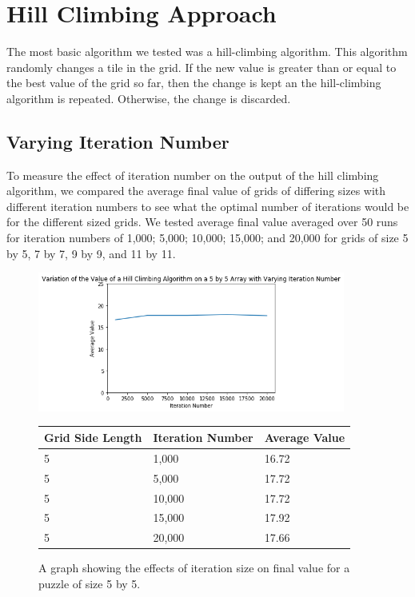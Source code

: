 \documentclass[12pt]{article}
\begin{document}
\section*{Hill Climbing Approach}

The most basic algorithm we tested was a hill-climbing algorithm. This algorithm randomly changes a tile in the grid. If the new value is greater than or equal to the best value of the grid so far, then the change is kept an the hill-climbing algorithm is repeated. Otherwise, the change is discarded. 

\subsection*{Varying Iteration Number}

To measure the effect of iteration number on the output of the hill climbing algorithm, we compared the average final value of grids of differing sizes with different iteration numbers to see what the optimal number of iterations would be for the different sized grids. We tested average final value averaged over 50 runs for iteration numbers of 1,000; 5,000; 10,000; 15,000; and 20,000 for grids of size 5 by 5, 7 by 7, 9 by 9, and 11 by 11.

\begin{figure}[H]
    \centering
    \includegraphics[width=0.9\textwidth]{hill_climbing_5x5_iterations}
\begin{tabular}{ |p{4cm}||p{4cm}|p{4cm}|  }
 \hline
Grid Side Length& Iteration Number &Average Value\\
 \hline
5&1,000&16.72\\
5&5,000&17.72\\
5&10,000&17.72\\
5&15,000&17.92\\
5&20,000&17.66\\
 \hline
\end{tabular}
    \caption{A graph showing the effects of iteration size on final value for a puzzle of size 5 by 5.}
    \label{fig:hill_climbing_5x5_iterations}
\end{figure}
\end{document}
